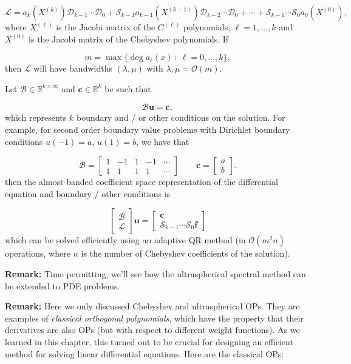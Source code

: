 \documentclass[12pt,landscape]{article}
\begin{document}
{\[
\mathcal{L} = a_k(X^{(k)})\mathcal{D}_{k-1}\cdots\mathcal{D}_0 + \mathcal{S}_{k-1}a_{k-1}(X^{(k-1)})\mathcal{D}_{k-2}\cdots\mathcal{D}_0 + \cdots + \mathcal{S}_{k-1}\cdots\mathcal{S}_{0}a_{0}(X^{(0)}),
\]
where $X^{(\ell)}$ is the Jacobi matrix of the $C^{(\ell)}$ polynomials, $\ell = 1, \ldots, k$ and  $X^{(0)}$ is the Jacobi matrix of the Chebyshev polynomials.  If 

\[
m = \max \{ \deg a_{\ell}(x) \: : \: \ell = 0, \ldots, k\},
\]
then $\mathcal{L}$ will have bandwidths $(\lambda, \mu)$ with $\lambda, \mu = \mathcal{O}(m)$. 

Let $\mathcal{B} \in \mathbb{R}^{k\times \infty}$ and $\mathbf{c} \in \mathbb{R}^{k}$ be such that 

\[
\mathcal{B}\mathbf{u} = \mathbf{c},
\]
which represents $k$ boundary and / or other conditions on the solution.  For example, for second order boundary value problems with Dirichlet boundary conditions $u(-1) = a$, $u(1)= b$, we have that 

\[
\mathcal{B} = 
\begin{bmatrix}
1 & -1 & 1 & -1 & \cdots  \\
1 &  1  & 1 & 1 & \cdots
\end{bmatrix} \qquad
\mathbf{c} = 
\begin{bmatrix} a \\
b 
\end{bmatrix}.
\]
then the almost-banded coefficient space representation of the differential equation and boundary / other conditions is

\[
\begin{bmatrix}
\mathcal{B} \\
\mathcal{L} 
\end{bmatrix}\mathbf{u} = 
\begin{bmatrix}
\mathbf{c} \\
\mathcal{S}_{k-1}\cdots\mathcal{S}_0\mathbf{f}
\end{bmatrix}
\]
which can be solved efficiently using an adaptive QR method (in $\mathcal{O}(m^2n)$ operations, where $n$ is the number of Chebyshev coefficients of the solution).  

\textbf{Remark:} Time permitting, we'll see how the ultraspherical spectral method can be extended to PDE problems.

\textbf{Remark:} Here we only discussed Chebyshev and ultraspherical OPs.  They are examples of \emph{classical orthogonal polynomials}, which have the property that their derivatives are also OPs (but with respect to different weight functions).  As we learned in this chapter, this turned out to be crucial for designing an efficient method for solving linear differential equations. Here are the classical OPs:

}
\end{document}
